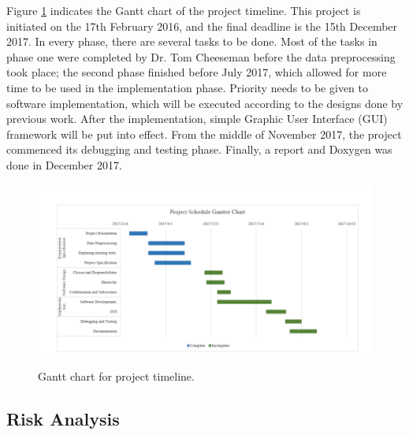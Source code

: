 Figure \ref{fig:gantterChart} indicates the Gantt chart of the project timeline. This project is initiated on the 17th February 2016, and the final deadline is the 15th December 2017. In every phase, there are several tasks to be done. Most of the tasks in phase one were completed by Dr. Tom Cheeseman before the data preprocessing took place; the second phase finished before July 2017, which allowed for more time to be used in the implementation phase. Priority needs to be given to software implementation, which will be executed according to the designs done by previous work. After the implementation, simple Graphic User Interface (GUI) framework will be put into effect. From the middle of November 2017, the project commenced its debugging and testing phase. Finally, a report and Doxygen was done in December 2017.
\begin{landscape}
	\begin{figure}[H]
		\centering    
		\includegraphics[scale=1]{Figs/Gantter-Chart}\\[1ex]
		\caption{Gantt chart for project timeline. }
		\label{fig:gantterChart}
	\end{figure}
	
\end{landscape}


\subsection{Risk Analysis}



